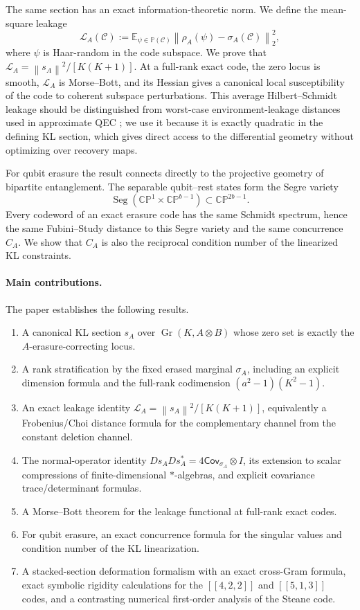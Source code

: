 \documentclass[11pt]{article}
\theoremstyle{definition}
\newcommand{\cC}{\mathcal C}
\newcommand{\cL}{\mathcal L}
\newcommand{\Gr}{\operatorname{Gr}}
\newcommand{\Pj}{\mathbb P}
\newcommand{\CP}{\mathbb{CP}}
\newcommand{\1}{\mathbf 1}
\newcommand{\norm}[1]{\left\lVert #1\right\rVert}
\begin{document}
The same section has an exact information-theoretic norm.  We define the mean-square leakage
\[
\cL_A(\cC)
:=\mathbb E_{\psi\in \Pj(\cC)}
\norm{\rho_A(\psi)-\sigma_A(\cC)}_2^2,
\]
where $\psi$ is Haar-random in the code subspace.  We prove that $\cL_A=\norm{s_A}^2/[K(K+1)]$.  At a full-rank exact code, the zero locus is smooth, $\cL_A$ is Morse--Bott, and its Hessian gives a canonical local susceptibility of the code to coherent subspace perturbations.  This average Hilbert--Schmidt leakage should be distinguished from worst-case environment-leakage distances used in approximate QEC \cite{ElimelechAlbertBarg2026}; we use it because it is exactly quadratic in the defining KL section, which gives direct access to the differential geometry without optimizing over recovery maps.

For qubit erasure the result connects directly to the projective geometry of bipartite entanglement.  The separable qubit--rest states form the Segre variety
\[
\operatorname{Seg}(\CP^1\times\CP^{b-1})\subset \CP^{2b-1}.
\]
Every codeword of an exact erasure code has the same Schmidt spectrum, hence the same Fubini--Study distance to this Segre variety and the same concurrence $C_A$.  We show that $C_A$ is also the reciprocal condition number of the linearized KL constraints.

\paragraph{Main contributions.}
The paper establishes the following results.
\begin{enumerate}[label=(\roman*)]
    \item A canonical KL section $s_A$ over $\Gr(K,A\otimes B)$ whose zero set is exactly the $A$-erasure-correcting locus.
    \item A rank stratification by the fixed erased marginal $\sigma_A$, including an explicit dimension formula and the full-rank codimension $(a^2-1)(K^2-1)$.
    \item An exact leakage identity $\cL_A=\norm{s_A}^2/[K(K+1)]$, equivalently a Frobenius/Choi distance formula for the complementary channel from the constant deletion channel.
    \item The normal-operator identity $D s_A D s_A^*=4\mathsf{Cov}_{\sigma_A}\otimes I$, its extension to scalar compressions of finite-dimensional $*$-algebras, and explicit covariance trace/determinant formulas.
    \item A Morse--Bott theorem for the leakage functional at full-rank exact codes.
    \item For qubit erasure, an exact concurrence formula for the singular values and condition number of the KL linearization.
    \item A stacked-section deformation formalism with an exact cross-Gram formula, exact symbolic rigidity calculations for the $[[4,2,2]]$ and $[[5,1,3]]$ codes, and a contrasting numerical first-order analysis of the Steane code.
\end{enumerate}
\end{document}
